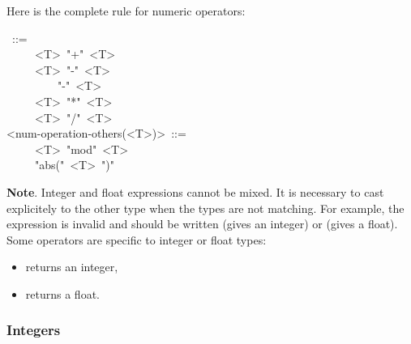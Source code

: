 {\noindent Here is the complete rule for numeric operators:%
\begin{mdpre}%
~::=\\
~~~~\textbar{}~{\textless{}T\textgreater{}}~"+"~{\textless{}T\textgreater{}}\\
~~~~\textbar{}~{\textless{}T\textgreater{}}~"-"~{\textless{}T\textgreater{}}\\
~~~~\textbar{}~~~~~"-"~{\textless{}T\textgreater{}}\\
~~~~\textbar{}~{\textless{}T\textgreater{}}~"*"~{\textless{}T\textgreater{}}\\
~~~~\textbar{}~{\textless{}T\textgreater{}}~"/"~{\textless{}T\textgreater{}}\\
{\textless{}num-operation-others(\textless{}T\textgreater{})\textgreater{}}~::=\\
~~~~\textbar{}~{\textless{}T\textgreater{}}~"mod"~{\textless{}T\textgreater{}}\\
~~~~\textbar{}~"abs("~{\textless{}T\textgreater{}}~")"%
\end{mdpre}
\noindent\textbf{Note}.
Integer and float expressions cannot be mixed. It is necessary to cast
explicitely to the other type when the types are not matching. For
example, the expression  is invalid and should be written
 (gives an integer) or  (gives a float).
Some operators are specific to integer or float types:%

\begin{itemize}[noitemsep,topsep=\mdcompacttopsep]%

\item{} returns an integer,%

\item{} returns a float.%
\end{itemize}%

\subsubsection{Integers}\label{sec-integers}%

}
